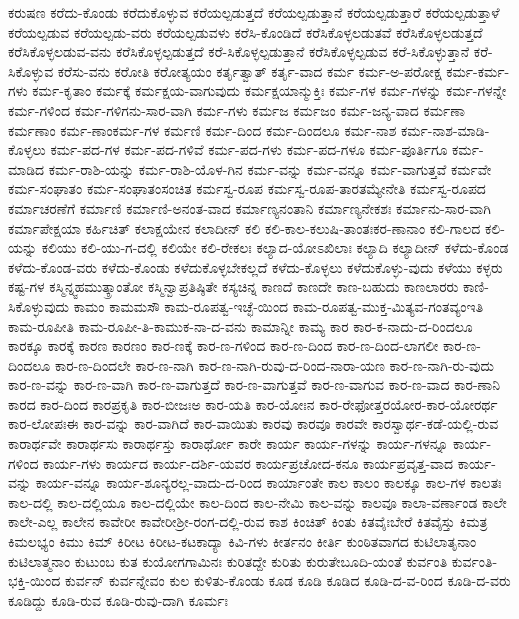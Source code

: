 {ಕರುಷಣ
ಕರೆದು-ಕೊಂಡು
ಕರೆದುಕೊಳ್ಳುವ
ಕರೆಯಲ್ಪಡುತ್ತದೆ
ಕರೆಯಲ್ಪಡುತ್ತಾನೆ
ಕರೆಯಲ್ಪಡುತ್ತಾರೆ
ಕರೆಯಲ್ಪಡುತ್ತಾಳೆ
ಕರೆಯಲ್ಪಡುವ
ಕರೆಯಲ್ಪಡು-ವರು
ಕರೆಯಲ್ಪಡುವಳು
ಕರೆಸಿ-ಕೊಂಡಿದೆ
ಕರೆಸಿಕೊಳ್ಳಲಡುತವೆ
ಕರೆಸಿಕೊಳ್ಳಲಡುತ್ತದೆ
ಕರೆಸಿಕೊಳ್ಳಲಡುವ-ವನು
ಕರೆಸಿಕೊಳ್ಳಲ್ಪಡುತ್ತದೆ
ಕರೆ-ಸಿಕೊಳ್ಳಲ್ಪಡುತ್ತಾನೆ
ಕರೆಸಿಕೊಳ್ಳಲ್ಪಡುವ
ಕರೆ-ಸಿಕೊಳ್ಳುತ್ತಾನೆ
ಕರೆ-ಸಿಕೊಳ್ಳುವ
ಕರೆಸು-ವನು
ಕರೋತಿ
ಕರೋತ್ಯಯಂ
ಕರ್ತೃತ್ವಾತ್
ಕರ್ತೃ-ವಾದ
ಕರ್ಮ
ಕರ್ಮ-ಅ-ಪರೋಕ್ಷ
ಕರ್ಮ-ಕರ್ಮ-ಗಳು
ಕರ್ಮ-ಕೃತಾಂ
ಕರ್ಮಕ್ಕೆ
ಕರ್ಮಕ್ಷಯ-ವಾಗುವುದು
ಕರ್ಮಕ್ಷಯಾನ್ಮುಕ್ತಿಃ
ಕರ್ಮ-ಗಳ
ಕರ್ಮ-ಗಳನ್ನು
ಕರ್ಮ-ಗಳನ್ನೇ
ಕರ್ಮ-ಗಳಿಂದ
ಕರ್ಮ-ಗಳಿಗನು-ಸಾರ-ವಾಗಿ
ಕರ್ಮ-ಗಳು
ಕರ್ಮಜ
ಕರ್ಮಜಂ
ಕರ್ಮ-ಜನ್ಯ-ವಾದ
ಕರ್ಮಣಾ
ಕರ್ಮಣಾಂ
ಕರ್ಮ-ಣಾಂಕರ್ಮ-ಗಳ
ಕರ್ಮಣಿ
ಕರ್ಮ-ದಿಂದ
ಕರ್ಮ-ದಿಂದಲೂ
ಕರ್ಮ-ನಾಶ
ಕರ್ಮ-ನಾಶ-ಮಾಡಿ-ಕೊಳ್ಳಲು
ಕರ್ಮ-ಪದ-ಗಳ
ಕರ್ಮ-ಪದ-ಗಳಿವೆ
ಕರ್ಮ-ಪದ-ಗಳು
ಕರ್ಮ-ಪದ-ಗಳೂ
ಕರ್ಮ-ಪೂರ್ತಿಗೂ
ಕರ್ಮ-ಮಾಡಿದ
ಕರ್ಮ-ರಾಶಿ-ಯನ್ನು
ಕರ್ಮ-ರಾಶಿ-ಯೊಳ-ಗಿನ
ಕರ್ಮ-ವನ್ನು
ಕರ್ಮ-ವನ್ನೂ
ಕರ್ಮ-ವಾಗುತ್ತವೆ
ಕರ್ಮವೇ
ಕರ್ಮ-ಸಂಘಾತಂ
ಕರ್ಮ-ಸಂಘಾತಂಸಂಚಿತ
ಕರ್ಮಸ್ವ-ರೂಪ
ಕರ್ಮಸ್ವ-ರೂಪ-ತಾರತಮ್ಯೇನೇತಿ
ಕರ್ಮಸ್ವ-ರೂಪದ
ಕರ್ಮಾಚರಣೆಗೆ
ಕರ್ಮಾಣಿ
ಕರ್ಮಾಣಿ-ಅನಂತ-ವಾದ
ಕರ್ಮಾಣ್ಯನಂತಾನಿ
ಕರ್ಮಾಣ್ಯನೇಕಶಃ
ಕರ್ಮಾನು-ಸಾರ-ವಾಗಿ
ಕರ್ಮಾಪೇಕ್ಷಯಾ
ಕರ್ಹಿಚಿತ್
ಕಲಾಕ್ಷಯೇನ
ಕಲಾದೀನ್
ಕಲಿ
ಕಲಿ-ಕಾಲ-ಕಲುಷಿ-ತಾಂತಃಕರ-ಣಾನಾಂ
ಕಲಿ-ಗಾಲದ
ಕಲಿ-ಯನ್ನು
ಕಲಿಯು
ಕಲಿ-ಯು-ಗ-ದಲ್ಲಿ
ಕಲಿಯೇ
ಕಲಿ-ರೇಕಲಃ
ಕಲ್ಯಾದ-ಯೋಽಖಿಲಾಃ
ಕಲ್ಯಾದಿ
ಕಲ್ಯಾದೀನ್
ಕಳೆದು-ಕೊಂಡ
ಕಳೆದು-ಕೊಂಡ-ವರು
ಕಳೆದು-ಕೊಂಡು
ಕಳೆದುಕೊಳ್ಳಬೇಕಲ್ಲದೆ
ಕಳೆದು-ಕೊಳ್ಳಲು
ಕಳೆದುಕೊಳ್ಳು-ವುದು
ಕಳೆಯು
ಕಳ್ಳರು
ಕಷ್ಟ-ಗಳ
ಕಸ್ಮಿನ್ನ್ವಹಮುತ್ಕ್ರಾಂತೋ
ಕಸ್ಮಿನ್ವಾಪ್ರತಿಷ್ಠಿತೇ
ಕಸ್ಯಚಿನ್ನ
ಕಾಣದೆ
ಕಾಣದೇ
ಕಾಣ-ಬಹುದು
ಕಾಣಲಾರರು
ಕಾಣಿ-ಸಿಕೊಳ್ಳುವುದು
ಕಾಮಂ
ಕಾಮಮಸೌ
ಕಾಮ-ರೂಪತ್ವ-ಇಚ್ಛೆ-ಯಿಂದ
ಕಾಮ-ರೂಪತ್ವ-ಮುಕ್ತ-ಮಿತ್ಯವ-ಗಂತವ್ಯಂಇತಿ
ಕಾಮ-ರೂಪೀತಿ
ಕಾಮ-ರೂಪೀ-ತಿ-ಕಾಮುಕ-ನಾ-ದ-ವನು
ಕಾಮಾನ್ನೀ
ಕಾಮ್ಯ
ಕಾರ
ಕಾರ-ಕ-ನಾದು-ದ-ರಿಂದಲೂ
ಕಾರಕ್ಕೂ
ಕಾರಕ್ಕೆ
ಕಾರಣ
ಕಾರಣಂ
ಕಾರ-ಣಕ್ಕೆ
ಕಾರ-ಣ-ಗಳಿಂದ
ಕಾರ-ಣ-ದಿಂದ
ಕಾರ-ಣ-ದಿಂದ-ಲಾಗಲೀ
ಕಾರ-ಣ-ದಿಂದಲೂ
ಕಾರ-ಣ-ದಿಂದಲೇ
ಕಾರ-ಣ-ನಾಗಿ
ಕಾರ-ಣ-ನಾಗಿ-ರುವು-ದ-ರಿಂದ-ನಾರಾ-ಯಣ
ಕಾರ-ಣ-ನಾಗಿ-ರು-ವುದು
ಕಾರ-ಣ-ವನ್ನು
ಕಾರ-ಣ-ವಾಗಿ
ಕಾರ-ಣ-ವಾಗುತ್ತದೆ
ಕಾರ-ಣ-ವಾಗುತ್ತವೆ
ಕಾರ-ಣ-ವಾಗುವ
ಕಾರ-ಣ-ವಾದ
ಕಾರ-ಣಾನಿ
ಕಾರದ
ಕಾರ-ದಿಂದ
ಕಾರಪ್ರಕೃತಿ
ಕಾರ-ಬೀಜಃಅ
ಕಾರ-ಯತಿ
ಕಾರ-ಯೋಃನ
ಕಾರ-ರೇಫೋತ್ತರಯೋರ-ಕಾರ-ಯೋರರ್ಥ
ಕಾರ-ಲೋಪಃಈ
ಕಾರ-ವನ್ನು
ಕಾರ-ವಾಗಿದೆ
ಕಾರ-ವಾಯಿತು
ಕಾರವು
ಕಾರವೂ
ಕಾರವೇ
ಕಾರಸ್ವಾರ್ಥ-ಕಡೆ-ಯಲ್ಲಿ-ರುವ
ಕಾರಾರ್ಥವೇ
ಕಾರಾರ್ಥಸು
ಕಾರಾರ್ಥಸ್ತು
ಕಾರಾರ್ಥೋ
ಕಾರೇ
ಕಾರ್ಯ
ಕಾರ್ಯ-ಗಳನ್ನು
ಕಾರ್ಯ-ಗಳನ್ನೂ
ಕಾರ್ಯ-ಗಳಿಂದ
ಕಾರ್ಯ-ಗಳು
ಕಾರ್ಯದ
ಕಾರ್ಯ-ದರ್ಶಿ-ಯವರ
ಕಾರ್ಯಪ್ರಚೋದ-ಕನೂ
ಕಾರ್ಯಪ್ರವೃತ್ತ-ವಾದ
ಕಾರ್ಯ-ವನ್ನು
ಕಾರ್ಯ-ವನ್ನೂ
ಕಾರ್ಯ-ಶೂನ್ಯರಲ್ಲ-ವಾದು-ದ-ರಿಂದ
ಕಾರ್ಯಾಂತೇ
ಕಾಲ
ಕಾಲಂ
ಕಾಲಕ್ಕೂ
ಕಾಲ-ಗಳ
ಕಾಲತಃ
ಕಾಲ-ದಲ್ಲಿ
ಕಾಲ-ದಲ್ಲಿಯೂ
ಕಾಲ-ದಲ್ಲಿಯೇ
ಕಾಲ-ದಿಂದ
ಕಾಲ-ನೇಮಿ
ಕಾಲ-ವನ್ನು
ಕಾಲವೂ
ಕಾಲಾ-ವರ್ಣಾಂಡ
ಕಾಲೇ
ಕಾಲೇ-ಎಲ್ಲ
ಕಾಲೇನ
ಕಾವೇರೀ
ಕಾವೇರೀಶ್ರೀ-ರಂಗ-ದಲ್ಲಿ-ರುವ
ಕಾಶ
ಕಿಂಚಿತ್
ಕಿಂತು
ಕಿತವೈಃಬೇರೆ
ಕಿತವೈಸ್ತು
ಕಿಮತ್ರ
ಕಿಮಲಭ್ಯಂ
ಕಿಮು
ಕಿಮ್
ಕಿರೀಟ
ಕಿರೀಟ-ಕಟಕಾದ್ಯಾ
ಕಿವಿ-ಗಳು
ಕೀರ್ತನಂ
ಕೀರ್ತಿ
ಕುಂಠಿತವಾಗದ
ಕುಟಿಲಾತೃನಾಂ
ಕುಟಿಲಾತ್ಮನಾಂ
ಕುಟುಂಬ
ಕುತ
ಕುಯೋಗಗಾಮಿನಃ
ಕುರಿತದ್ದೇ
ಕುರಿತು
ಕುರುತೇಬೂದಿ-ಯಂತೆ
ಕುರ್ವಂತಿ
ಕುರ್ವಂತಿ-ಭಕ್ತಿ-ಯಿಂದ
ಕುರ್ವನ್
ಕುರ್ವನ್ನೇವಂ
ಕುಲ
ಕುಳಿತು-ಕೊಂಡು
ಕೂಡ
ಕೂಡಿ
ಕೂಡಿದ
ಕೂಡಿ-ದ-ವ-ರಿಂದ
ಕೂಡಿ-ದ-ವರು
ಕೂಡಿದ್ದು
ಕೂಡಿ-ರುವ
ಕೂಡಿ-ರುವು-ದಾಗಿ
ಕೂರ್ಮಃ
}
